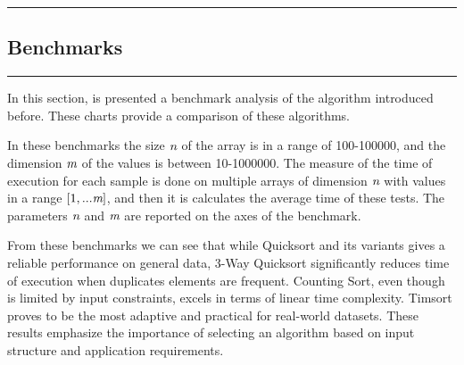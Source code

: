 {\color{gray}\hrule}
\begin{center}
\section{Benchmarks}
\bigskip
\end{center}
{\color{gray}\hrule}
\vspace{0.5cm}
In this section, is presented a benchmark analysis of the algorithm introduced before. These charts provide a comparison of these algorithms.

In these benchmarks the size $\emph{n}$ of the array is in a range of 100-100000, and the dimension $\emph{m}$ of the values is between 10-1000000.
The measure of the time of execution for each sample is done on multiple arrays of dimension $\emph{n}$ with values in a range $[1,...\emph{m}]$, and then it is calculates the average time of these tests. The parameters $\emph{n}$ and $\emph{m}$ are reported on the axes of the benchmark.


From these benchmarks we can see that while Quicksort and its variants gives a reliable performance on general data, 3-Way Quicksort significantly reduces time of execution when duplicates elements are frequent. Counting Sort, even though is limited by input constraints, excels in terms of linear time complexity. Timsort proves to be the most adaptive and practical for real-world datasets. These results emphasize the importance of selecting an algorithm based on input structure and application requirements.

